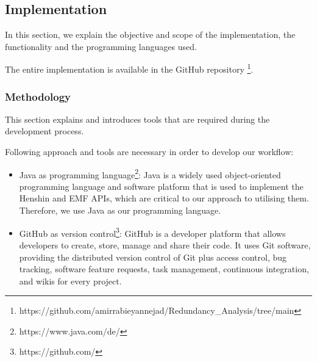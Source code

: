 \subsection{Implementation}\label{redundancy_implementation}
In this section, we explain the objective and scope of the implementation, the functionality and the programming languages used.

The entire implementation is available in the GitHub repository \footnote{https://github.com/amirrabieyannejad/Redundancy\_Analysis/tree/main}.
\subsubsection*{Methodology}
This section explains and introduces tools that are required during the development process.

Following approach and tools are necessary in order to develop our workflow:
\begin{itemize}	
	\item Java as programming language\footnote{https://www.java.com/de/}: Java is a widely used object-oriented programming language and software platform that is used to implement the Henshin and EMF APIs, which are critical to our approach to utilising them. Therefore, we use Java as our programming language.
	
	\item GitHub as version control\footnote{https://github.com/}: GitHub is a developer platform that allows developers to create, store, manage and share their code. It uses Git software, providing the distributed version control of Git plus access control, bug tracking, software feature requests, task management, continuous integration, and wikis for every project.
\end{itemize} 
